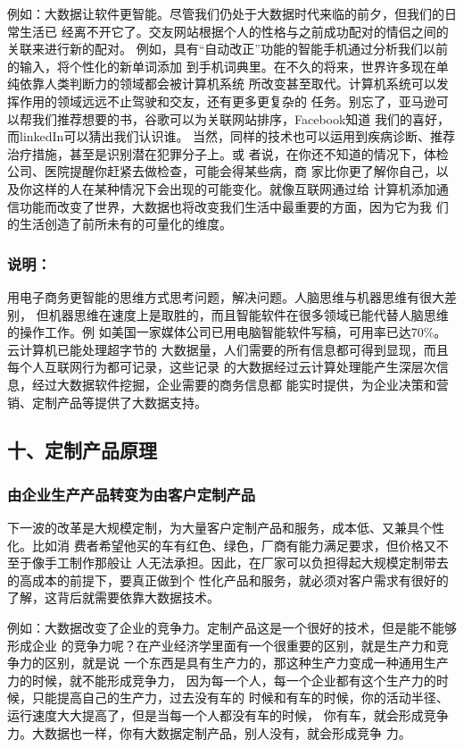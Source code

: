 \documentclass[11pt]{ctexart}
\begin{document}
{{{{例如：大数据让软件更智能。尽管我们仍处于大数据时代来临的前夕，但我们的日常生活已
经离不开它了。交友网站根据个人的性格与之前成功配对的情侣之间的关联来进行新的配对。
例如，具有“自动改正”功能的智能手机通过分析我们以前的输入，将个性化的新单词添加
到手机词典里。在不久的将来，世界许多现在单纯依靠人类判断力的领域都会被计算机系统
所改变甚至取代。计算机系统可以发挥作用的领域远远不止驾驶和交友，还有更多更复杂的
任务。别忘了，亚马逊可以帮我们推荐想要的书，谷歌可以为关联网站排序，Facebook知道
我们的喜好，而linkedIn可以猜出我们认识谁。
当然，同样的技术也可以运用到疾病诊断、推荐治疗措施，甚至是识别潜在犯罪分子上。或
者说，在你还不知道的情况下，体检公司、医院提醒你赶紧去做检查，可能会得某些病，商
家比你更了解你自己，以及你这样的人在某种情况下会出现的可能变化。就像互联网通过给
计算机添加通信功能而改变了世界，大数据也将改变我们生活中最重要的方面，因为它为我
们的生活创造了前所未有的可量化的维度。

\subsubsection{说明：}
\label{sec:orgc165d75}

用电子商务更智能的思维方式思考问题，解决问题。人脑思维与机器思维有很大差别，
但机器思维在速度上是取胜的，而且智能软件在很多领域已能代替人脑思维的操作工作。例
如美国一家媒体公司已用电脑智能软件写稿，可用率已达70\%。云计算机已能处理超字节的
大数据量，人们需要的所有信息都可得到显现，而且每个人互联网行为都可记录，这些记录
的大数据经过云计算处理能产生深层次信息，经过大数据软件挖掘，企业需要的商务信息都
能实时提供，为企业决策和营销、定制产品等提供了大数据支持。

\subsection{十、定制产品原理}
\label{sec:org07e95f5}

\subsubsection{由企业生产产品转变为由客户定制产品}
\label{sec:orge7ed542}

下一波的改革是大规模定制，为大量客户定制产品和服务，成本低、又兼具个性化。比如消
费者希望他买的车有红色、绿色，厂商有能力满足要求，但价格又不至于像手工制作那般让
人无法承担。因此，在厂家可以负担得起大规模定制带去的高成本的前提下，要真正做到个
性化产品和服务，就必须对客户需求有很好的了解，这背后就需要依靠大数据技术。

例如：大数据改变了企业的竞争力。定制产品这是一个很好的技术，但是能不能够形成企业
的竞争力呢？在产业经济学里面有一个很重要的区别，就是生产力和竞争力的区别，就是说
一个东西是具有生产力的，那这种生产力变成一种通用生产力的时候，就不能形成竞争力，
因为每一个人，每一个企业都有这个生产力的时候，只能提高自己的生产力，过去没有车的
时候和有车的时候，你的活动半径、运行速度大大提高了，但是当每一个人都没有车的时候，
你有车，就会形成竞争力。大数据也一样，你有大数据定制产品，别人没有，就会形成竞争
力。

}}}}
\end{document}

